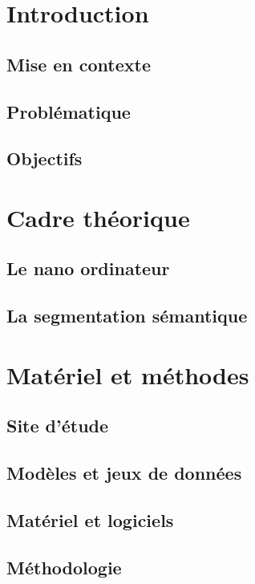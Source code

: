 \documentclass[12pt, letterpaper]{article}
\begin{document}
\section{Introduction}
\subsection{Mise en contexte}

\subsection{Problématique}

\subsection{Objectifs}

\section{Cadre théorique}
\subsection{Le nano ordinateur}

\subsection{La segmentation sémantique}

\section{Matériel et méthodes}
\subsection{Site d'étude}

\subsection{Modèles et jeux de données}

\subsection{Matériel et logiciels}

\subsection{Méthodologie}

\end{document}
